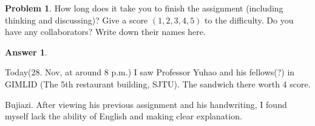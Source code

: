 \documentclass{article}
\theoremstyle{definition}
\newtheorem{prob}{Problem}
\newtheorem{ans}{Answer}
\begin{document}
	\begin{prob}
		How long does it take you to finish the assignment (including thinking and discussing)? Give a score $(1,2,3,4,5)$ to the difficulty. Do you have any collaborators? Write down their names here.
	\end{prob}

	\begin{ans}
		~
		
		Today(28. Nov, at around 8 p.m.) I saw Professor Yuhao and his fellows(?) in GIMLID (The 5th restaurant building, SJTU). The sandwich there worth 4 score.
		
		Bujiazi. After viewing his previous assignment and his handwriting, I found myself lack the ability of English and making clear explanation. 
	\end{ans}
\end{document}
